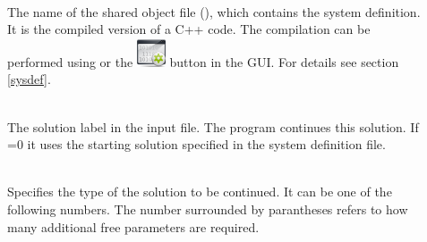 \documentclass[10pt,a4paper]{ddedoc}
\newcommand{\iconBuild}{\protect\includegraphics[height=0.8\baselineskip]{fig/cr32-action-build}}
\begin{document}
\begin{description}
\item[] ~\\
The name of the shared object file (),
which contains the system definition. It is the compiled version of a C++
code. The compilation can be performed using  or the \iconBuild{} button in the GUI. For details see section \ref{sysdef}.
%
\item[] ~\\
The solution label in the input file. The program continues this
solution. If =0 it uses the starting solution specified 
in the system definition file.
%
\item[] ~\\
Specifies the type of the solution to be continued. It can be one of the following numbers.
The number surrounded by parantheses refers to how many additional free
parameters are required.


\end{description}
\end{document}
